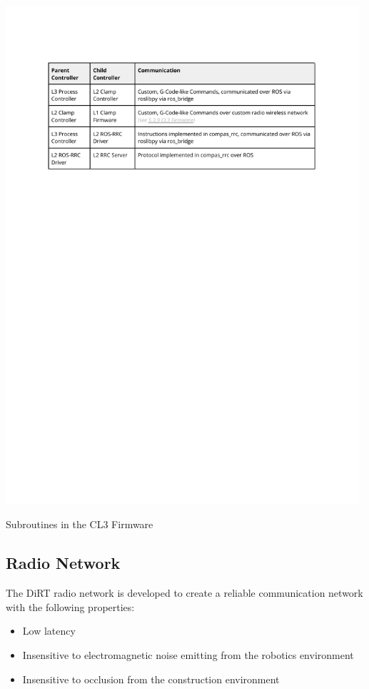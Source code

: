 \begin{table}[h]
    \includegraphics[page=9, trim=25.4mm 200mm 25.4mm 33mm, clip, width=0.98\textwidth]{tables/Tables in Chapter 5.pdf}
    \caption{Subroutines in the CL3 Firmware}
    \label{table:cl3-firmware-subroutines}
\end{table}

\subsection{Radio Network}
\label{subsection:exploration-2-radio-network}

The DiRT radio network is developed to create a reliable communication network with the following properties:

\begin{itemize}[nosep]
    \item Low latency
    \item Insensitive to electromagnetic noise emitting from the robotics environment
    \item Insensitive to occlusion from the construction environment
\end{itemize}

